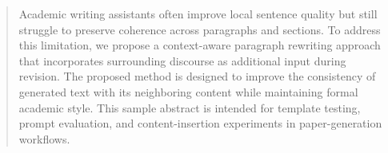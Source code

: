 \begin{abstract}
Academic writing assistants often improve local sentence quality but still struggle to preserve coherence across paragraphs and sections. To address this limitation, we propose a context-aware paragraph rewriting approach that incorporates surrounding discourse as additional input during revision. The proposed method is designed to improve the consistency of generated text with its neighboring content while maintaining formal academic style. This sample abstract is intended for template testing, prompt evaluation, and content-insertion experiments in paper-generation workflows.
\end{abstract}

